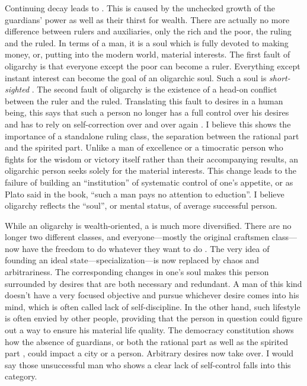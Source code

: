Continuing decay leads to . This is caused by the unchecked
growth of the guardians’ power as well as their thirst for wealth.
There are actually no more difference between rulers and auxiliaries, only the
rich and the poor, the ruling and the ruled. In terms of a man, it is a soul
which is fully devoted to making money, or, putting into the modern world,
material interests. The first fault of oligarchy is that everyone except the
poor can become a ruler. Everything except instant interest can become
the goal of an oligarchic soul. Such a soul is \emph{short-sighted}
. The second fault of oligarchy is the existence of a head-on
conflict between the ruler and the ruled. Translating this fault to
desires in a human being, this says that such a person no longer has a full
control over his desires and has to rely on self-correction over and over again
. I believe this shows the importance of a standalone ruling class,
the separation between the rational part and the spirited part. Unlike a man of
excellence or a timocratic person who fights for the wisdom or victory itself
rather than their accompanying results, an oligarchic person seeks solely for
the material interests. This change leads to the failure of building an
“institution” of systematic control of one’s appetite, or as Plato said in the
book, “such a man pays no attention to eduction”. I believe oligarchy
reflects the “soul”, or mental status, of average successful person.

While an oligarchy is wealth-oriented, a  is much more
diversified. There are no longer two different classes, and everyone—mostly the
original craftsmen class—now have the freedom to do whatever they want to do
. The very idea of founding an ideal state—specialization—is now
replaced by chaos and arbitrariness. The corresponding changes in
one’s soul makes this person surrounded by desires that are both necessary and
redundant. A man of this kind doesn’t have a very focused objective
and pursue whichever desire comes into his mind, which is often called
lack of self-discipline. In the other hand, such lifestyle is often envied by
other people, providing that the person in question could figure out
a way to ensure his material life quality. The democracy constitution shows how
the absence of guardians, or both the rational part as well as the spirited part
, could impact a city or a person. Arbitrary desires now take over. I would say
those unsuccessful man who shows a clear lack of self-control falls into this
category.

